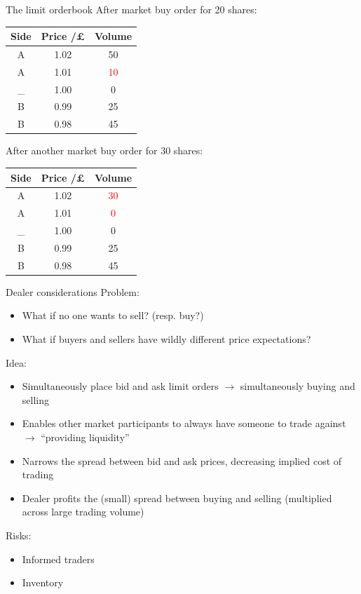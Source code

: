 \documentclass{beamer} %
\begin{document}
\begin{frame}{The limit orderbook}
    After market buy order for 20 shares:
    \begin{center}
        \begin{tabular}{ |c|c|c| } 
            \hline
            Side & Price /£ & Volume \\ 
            \hline
            A & 1.02 & 50 \\
            A & 1.01 & \textcolor{red}{10} \\
            \_ & 1.00 & 0 \\
            B & 0.99 & 25 \\ 
            B & 0.98 & 45 \\
            \hline
        \end{tabular}
    \end{center}
    After another market buy order for 30 shares:
    \begin{center}
        \begin{tabular}{ |c|c|c| } 
            \hline
            Side & Price /£ & Volume \\ 
            \hline
            A & 1.02 & \textcolor{red}{30} \\
            A & 1.01 & \textcolor{red}{0} \\
            \_ & 1.00 & 0 \\
            B & 0.99 & 25 \\ 
            B & 0.98 & 45 \\
            \hline
        \end{tabular}
    \end{center}
\end{frame}

\begin{frame}{Dealer considerations}
    Problem:
    \begin{itemize}
        \item What if no one wants to sell? (resp. buy?)
        \item What if buyers and sellers have wildly different price expectations?
    \end{itemize}
    Idea:
    \begin{itemize}
        \item Simultaneously place bid and ask limit orders $\rightarrow$ simultaneously buying and selling
        \item Enables other market participants to always have someone to trade against $\rightarrow$ ``providing liquidity''
        \item Narrows the spread between bid and ask prices, decreasing implied cost of trading
        \item Dealer profits the (small) spread between buying and selling (multiplied across large trading volume)
    \end{itemize}
    Risks:
    \begin{itemize}
        \item Informed traders
        \item Inventory
    \end{itemize}
\end{frame}
\end{document}
